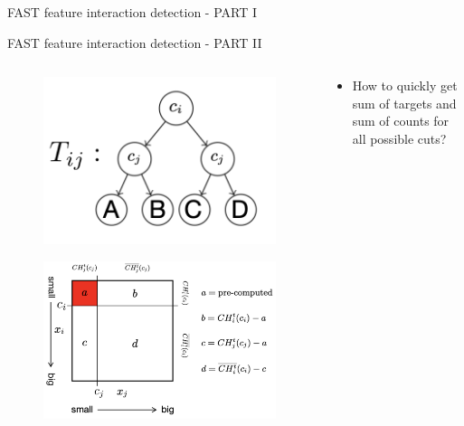 \documentclass[11pt,compress,t,notes=noshow, aspectratio=169, xcolor=table]{beamer}
\begin{document}
\begin{frame}{FAST feature interaction detection - PART I}
\end{frame}

\begin{frame}{FAST feature interaction detection - PART II}

\begin{columns}[T, totalwidth=\textwidth]
\begin{column}{0.5\textwidth}
\begin{figure}
    \centering
    \includegraphics[width=0.6\linewidth]
    {slides//02_interpretable-models//figure/T_ij.png}
    \label{fig:tree-like predictor2}
\end{figure}
\begin{figure}
    \centering
    \includegraphics[width=\linewidth]
    {slides//02_interpretable-models//figure/FAST.png}
    \label{fig:FAST2}
\end{figure}
\end{column}
\hfill
\centering
\begin{column}{0.5\textwidth}
\begin{itemize}
    \item How to quickly get sum of targets and sum of counts for all possible cuts?\\

\end{itemize}
\end{column}
\end{columns}
\end{frame}
\end{document}
